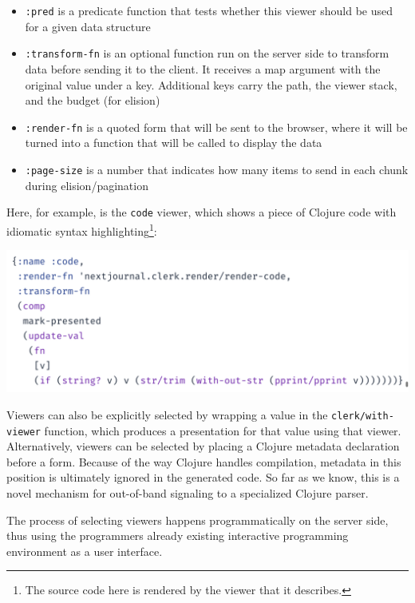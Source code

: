 \documentclass[sigconf,screen]{acmart}
\newcommand{\passthrough}[1]{#1}
\providecommand{\tightlist}{%
  \setlength{\itemsep}{0pt}\setlength{\parskip}{0pt}}
\begin{document}
\begin{itemize}
\tightlist
\item
  \passthrough{\lstinline!:pred!} is a predicate function that tests whether this viewer should be used for a given data structure
\item
  \passthrough{\lstinline!:transform-fn!} is an optional function run on the server side to transform data before sending it to the client. It receives a map argument with the original value under a key. Additional keys carry the path, the viewer stack, and the budget (for elision)
\item
  \passthrough{\lstinline!:render-fn!} is a quoted form that will be sent to the browser, where it will be turned into a function that will be called to display the data
\item
  \passthrough{\lstinline!:page-size!} is a number that indicates how many items to send in each chunk during elision/pagination
\end{itemize}

Here, for example, is the \passthrough{\lstinline!code!} viewer, which shows a piece of Clojure code with idiomatic syntax highlighting\footnote{The source code here is rendered by the viewer that it describes.}:

\includegraphics{images/anon-expr-5drCPuwp8LirNTWeyr5WSDHWVV2rnC-result.png}

Viewers can also be explicitly selected by wrapping a value in the \passthrough{\lstinline!clerk/with-viewer!} function, which produces a presentation for that value using that viewer. Alternatively, viewers can be selected by placing a Clojure metadata declaration before a form. Because of the way Clojure handles compilation, metadata in this position is ultimately ignored in the generated code. So far as we know, this is a novel mechanism for out-of-band signaling to a specialized Clojure parser.

The process of selecting viewers happens programmatically on the server side, thus using the programmer\textquotesingle s already existing interactive programming environment as a user interface.
\end{document}
